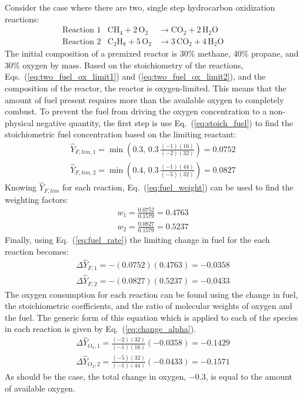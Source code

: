 Consider the case where there are two, single step hydrocarbon oxidization reactions:
\begin{align}
&\mbox{Reaction 1}& \mathrm{CH_4 + 2 \, O_2} &\rightarrow  \mathrm{CO_2 + 2 \, H_2O}       && && \label{eq:two_fuel_ox_limit1} \\
&\mbox{Reaction 2}& \mathrm{C_3H_8 + 5 \, O_2} &\rightarrow \mathrm{3 \,CO_2 + 4 \, H_2O}  && && \label{eq:two_fuel_ox_limit2}
\end{align}
The initial composition of a premixed reactor is 30\% methane, 40\% propane, and 30\% oxygen by mass. Based on the stoichiometry of the reactions, Eqs.~(\ref{eq:two_fuel_ox_limit1}) and (\ref{eq:two_fuel_ox_limit2}), and the composition of the reactor, the reactor is oxygen-limited. This means that the amount of fuel present requires more than the available oxygen to completely combust. To prevent the fuel from driving the oxygen concentration to a non-physical negative quantity, the first step is use Eq.~(\ref{eq:stoich_fuel}) to find the stoichiometric fuel concentration based on the limiting reactant:
\begin{align}
\hat{Y}_{F,lim,1} = \min \left (0.3,\,0.3\,\frac{(-1) (16)}{(-2)(32)} \right) = 0.0752 \\
\hat{Y}_{F,lim,2} = \min \left (0.4,\,0.3\,\frac{(-1) (44)}{(-5)(32)} \right) = 0.0827
\end{align}
Knowing $\hat{Y}_{F,lim}$ for each reaction, Eq.~(\ref{eq:fuel_weight}) can be used to find the weighting factors:
\begin{align}
w_1 =  \frac{0.0752}{0.1579} = 0.4763 \\
w_2 =  \frac{0.0827}{0.1579} = 0.5237
\end{align}
Finally, using Eq.~(\ref{eq:fuel_rate}) the limiting change in fuel for the each reaction becomes:
\begin{align}
\Delta \hat{Y}_{F,1} = - (0.0752)(0.4763) = -0.0358 \\
\Delta \hat{Y}_{F,2} = - (0.0827)(0.5237) = -0.0433
\end{align}
The oxygen consumption for each reaction can be found using the change in fuel, the stoichiometric coefficients, and the ratio of molecular weights of oxygen and the fuel. The generic form of this equation which is applied to each of the species in each reaction is given by Eq.~(\ref{eq:change_alpha}).
\begin{align}
\Delta \hat{Y}_{O_2,1} = \frac{(-2)(32)}{(-1)(16)}(-0.0358) = -0.1429 \\
\Delta \hat{Y}_{O_2,2} = \frac{(-5)(32)}{(-1)(44)}(-0.0433) = -0.1571
\end{align}
As should be the case, the total change in oxygen, $-0.3$, is equal to the amount of available oxygen.

